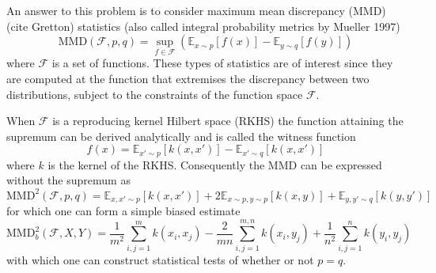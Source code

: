 \documentclass{article} %
\begin{document}
An answer to this problem is to consider maximum mean discrepancy (MMD) (cite Gretton) statistics (also called integral probability metrics by Mueller 1997)
\begin{equation}
\textrm{MMD}(\mathcal{F},p,q) = \sup_{f \in \mathcal{F}}(\mathbb{E}_{x\sim p}[f(x)] - \mathbb{E}_{y\sim q}[f(y)])
\end{equation}
where $\mathcal{F}$ is a set of functions.
These types of statistics are of interest since they are computed at the function that extremises the discrepancy between two distributions, subject to the constraints of the function space $\mathcal{F}$.

When $\mathcal{F}$ is a reproducing kernel Hilbert space (RKHS) the function attaining the supremum can be derived analytically and is called the witness function
\begin{equation}
f(x) = \mathbb{E}_{x'\sim p}[k(x,x')] - \mathbb{E}_{x'\sim q}[k(x,x')]
\end{equation}
where $k$ is the kernel of the RKHS.
Consequently the MMD can be expressed without the supremum as
\begin{equation}
  \textrm{MMD}^2(\mathcal{F},p,q) = \mathbb{E}_{x,x'\sim p}[k(x,x')] + 2\mathbb{E}_{x\sim p,y\sim p}[k(x,y)] + \mathbb{E}_{y,y'\sim q}[k(y,y')]
\end{equation}
for which one can form a simple biased estimate
\begin{equation}
  \textrm{MMD}_b^2(\mathcal{F},X,Y) = \frac{1}{m^2}\sum_{i,j=1}^{m}k(x_i,x_j) - \frac{2}{mn}\sum_{i,j=1}^{m,n}k(x_i,y_j) + \frac{1}{n^2}\sum_{i,j=1}^{n}k(y_i,y_j)
\end{equation}
with which one can construct statistical tests of whether or not $p=q$.
\end{document}
